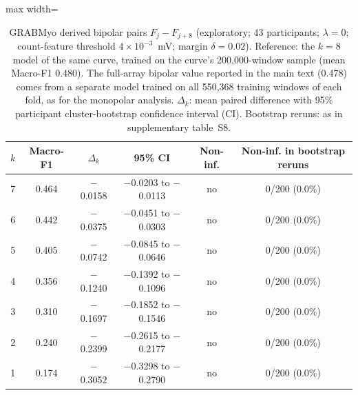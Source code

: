 \begin{table}[htbp]
\centering
\small
\caption{GRABMyo derived bipolar pairs $F_j - F_{j+8}$ (exploratory; 43 participants; $\lambda = 0$; count-feature threshold $4 \times 10^{-3}$~mV; margin $\delta = 0.02$). Reference: the $k = 8$ model of the same curve, trained on the curve's 200,000-window sample (mean Macro-F1 0.480). The full-array bipolar value reported in the main text (0.478) comes from a separate model trained on all 550{,}368 training windows of each fold, as for the monopolar analysis. $\Delta_k$: mean paired difference with 95\% participant cluster-bootstrap confidence interval (CI). Bootstrap reruns: as in supplementary table~S8.}
\label{tab:bipolar}
\setlength{\tabcolsep}{4pt}
\begin{adjustbox}{max width=\textwidth}
\begin{tabular}{rccccc}
\toprule
$k$ & Macro-F1 & $\Delta_k$ & 95\% CI & Non-inf. & Non-inf. in bootstrap reruns \\
\midrule
7 & 0.464 & $-$0.0158 & $-$0.0203 to $-$0.0113 & no & 0/200 (0.0\%) \\
6 & 0.442 & $-$0.0375 & $-$0.0451 to $-$0.0303 & no & 0/200 (0.0\%) \\
5 & 0.405 & $-$0.0742 & $-$0.0845 to $-$0.0646 & no & 0/200 (0.0\%) \\
4 & 0.356 & $-$0.1240 & $-$0.1392 to $-$0.1096 & no & 0/200 (0.0\%) \\
3 & 0.310 & $-$0.1697 & $-$0.1852 to $-$0.1546 & no & 0/200 (0.0\%) \\
2 & 0.240 & $-$0.2399 & $-$0.2615 to $-$0.2177 & no & 0/200 (0.0\%) \\
1 & 0.174 & $-$0.3052 & $-$0.3298 to $-$0.2790 & no & 0/200 (0.0\%) \\
\bottomrule
\end{tabular}
\end{adjustbox}
\end{table}
